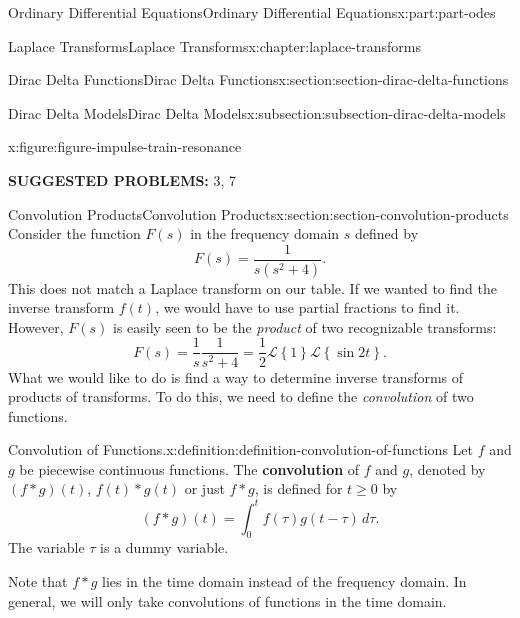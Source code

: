 \documentclass[oneside,10pt,]{book}
\newcommand{\terminology}[1]{\textbf{#1}}
\numberwithin{equation}{part}
\newcommand{\Int}[2]{\int_{#1}^{#2}}
\newcommand{\Laplace}[1]{\mathcal{L}\left\{#1\right\}}
\begin{document}
\begin{partptx}{Ordinary Differential Equations}{}{Ordinary Differential Equations}{}{}{x:part:part-odes}
\begin{chapterptx}{Laplace Transforms}{}{Laplace Transforms}{}{}{x:chapter:laplace-transforms}
\begin{sectionptx}{Dirac Delta Functions}{}{Dirac Delta Functions}{}{}{x:section:section-dirac-delta-functions}
\begin{subsectionptx}{Dirac Delta Models}{}{Dirac Delta Models}{}{}{x:subsection:subsection-dirac-delta-models}
\begin{figureptx}{}{x:figure:figure-impulse-train-resonance}{}
\begin{image}{0}{1}{0}
{
}%
\end{image}%
\tcblower
\end{figureptx}%
\end{subsectionptx}
\terminology{SUGGESTED PROBLEMS:} 3, 7\end{sectionptx}
%
%
\typeout{************************************************}
\typeout{************************************************}
%
\begin{sectionptx}{Convolution Products}{}{Convolution Products}{}{}{x:section:section-convolution-products}
Consider the function \(F(s)\) in the frequency domain \(s\) defined by%
\begin{equation*}
F(s) = \frac{1}{s(s^{2}+4)}.
\end{equation*}
This does not match a Laplace transform on our table. If we wanted to find the inverse transform \(f(t)\), we would have to use partial fractions to find it. However, \(F(s)\) is easily seen to be the \emph{product} of two recognizable transforms:%
\begin{equation*}
F(s) = \frac{1}{s} \frac{1}{s^{2}+4} = \frac{1}{2}\Laplace{1}\Laplace{\sin2t}.
\end{equation*}
What we would like to do is find a way to determine inverse transforms of products of transforms. To do this, we need to define the \emph{convolution} of two functions.%
\begin{definition}{Convolution of Functions.}{x:definition:definition-convolution-of-functions}%
Let \(f\) and \(g\) be piecewise continuous functions. The \terminology{convolution} of \(f\) and \(g\), denoted by \((f\ast g)(t)\), \(f(t)\ast g(t)\) or just \(f\ast g\), is defined for \(t\geq0\) by%
\begin{equation*}
(f\ast g)(t) = \Int{0}{t} f(\tau)g(t-\tau)\,d\tau.
\end{equation*}
The variable \(\tau\) is a dummy variable.%
\end{definition}
Note that \(f\ast g\) lies in the time domain instead of the frequency domain. In general, we will only take convolutions of functions in the time domain.%
\par

\end{sectionptx}
\end{chapterptx}
\end{partptx}
\end{document}
